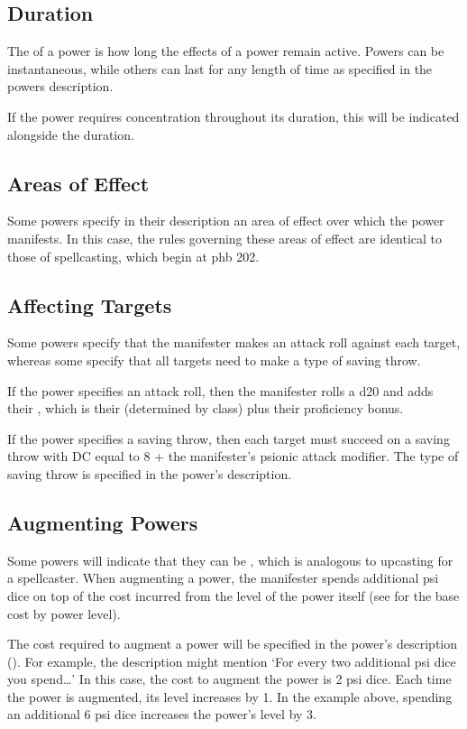 \subsection{Duration}
The  of a power is how long the effects
of a power remain active.
Powers can be instantaneous,
while others can last for any length of time
as specified in the powers description.

If the power requires concentration throughout its duration,
this will be indicated alongside the duration.

\subsection{Areas of Effect}
Some powers specify in their description an area of effect
over which the power manifests.
In this case, the rules governing these areas of effect
are identical to those of spellcasting, which begin at
phb 202.

\subsection{Affecting Targets}
Some powers specify that the manifester makes an attack
roll against each target,
whereas some specify that all targets need to make
a type of saving throw.

If the power specifies an attack roll,
then the manifester rolls a d20
and adds their ,
which is their  (determined by class)
plus their proficiency bonus.

If the power specifies a saving throw,
then each target must succeed on a saving throw
with DC equal to 8 + the manifester's psionic attack modifier.
The type of saving throw
is specified in the power's description.

\subsection{Augmenting Powers}
\label{sub:augmenting}
Some powers will indicate that they can be ,
which is analogous to upcasting for a spellcaster.
When augmenting a power,
the manifester spends additional psi dice on top of the cost
incurred from the level of the power itself
(see  for the base cost by power level).

The cost required to augment a power will be specified
in the power's description ().
For example, the description might mention
`For every two additional psi dice you spend\dots'
In this case, the cost to augment the power is 2 psi dice.
Each time the power is augmented,
its level increases by 1.
In the example above,
spending an additional 6 psi dice increases the power's level by 3.

